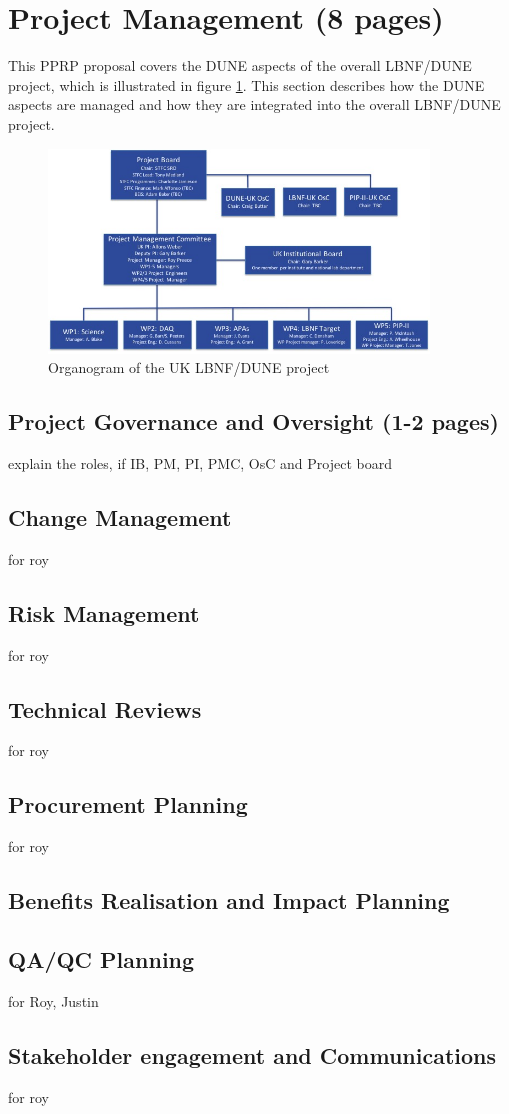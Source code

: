 \section{Project Management (8 pages)}

This PPRP proposal covers the DUNE aspects of the overall LBNF/DUNE project, which is illustrated in figure \ref{fig:organogram}. This section describes how the DUNE aspects are managed and how they are integrated into the overall LBNF/DUNE project.
\begin{figure}[htb]
    \centering
    \includegraphics[width=0.9\textwidth]{figs/organogram.jpg}
    \caption{Organogram of the UK LBNF/DUNE project}
    \label{fig:organogram}
\end{figure}

\subsection{Project Governance and Oversight (1-2 pages)} 

explain the roles, if IB\cite{IB}, PM, PI, PMC, OsC and Project board

\subsection{Change Management}
for roy

\subsection{Risk Management}
for roy

\subsection{Technical Reviews}
for roy

\subsection{Procurement Planning}
for roy

\subsection{Benefits Realisation and Impact Planning}

\subsection{QA/QC Planning}
for Roy, Justin

\subsection{Stakeholder engagement and Communications}
for roy